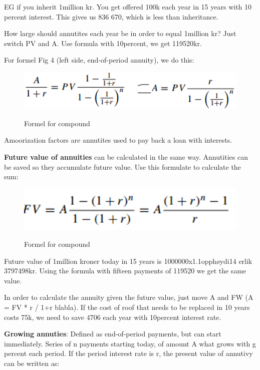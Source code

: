 EG if you inherit 1million kr. You get offered 100k each year in 15 years with 10 percent interest. This gives us 836 670, which is less than inheritance. 

How large should annutites each year be in order to equal 1million kr? Just switch PV and A. Use formula with 10percent, we get 119520kr.

For formel Fig 4 (left side, end-of-period annuity), we do this:

\begin{figure}[ht!]
\centering
\includegraphics[width=120mm]{figures/formel1-6.png}
\label{fig:formel1-6}
\caption{Formel for compound}
\end{figure}

Amoorization factors are annutites used to pay back a loan with interests.

\textbf{Future value of annuities} can be calculated in the same way. Annutities can be saved so they accumulate future value. Use this formulate to calculate the sum:

\begin{figure}[ht!]
\centering
\includegraphics[width=120mm]{figures/formel1-7.png}
\label{fig:formel1-7}
\caption{Formel for compound}
\end{figure}

Future value of 1million kroner today in 15 years is 1000000x1.1opphøydi14 erlik 3797498kr. Using the formula with fifteen payments of 119520 we get the same value.

In order to calculate the annuity given the future value, just move A and FW (A = FV * r / 1+r blabla). If the cost of roof that needs to be replaced in 10 years costs 75k, we need to save 4706 each year with 10percent interest rate.


\textbf{Growing annuties}: Defined as end-of-period payments, but can start immediately. Series of n payments starting today, of amount A what grows with g percent each period. If the period interest rate is r, the present value of annutivy can be written as:


